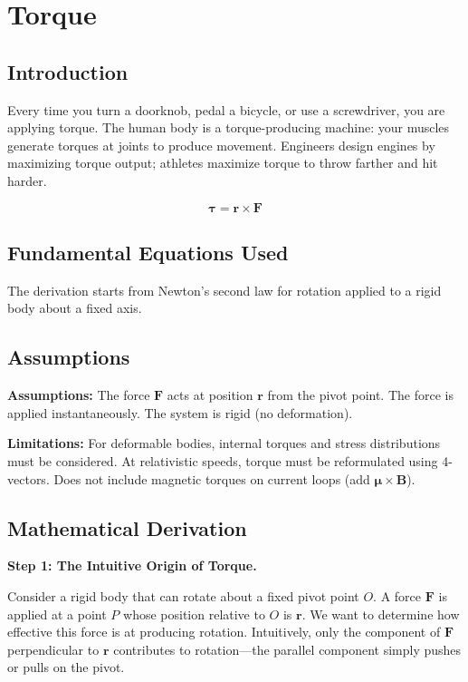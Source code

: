 \chapter{Torque}

\section*{Introduction}

Every time you turn a doorknob, pedal a bicycle, or use a screwdriver, you are applying torque. The human body is a torque-producing machine: your muscles generate torques at joints to produce movement. Engineers design engines by maximizing torque output; athletes maximize torque to throw farther and hit harder.



\[
\boldsymbol{\tau} = \mathbf{r} \times \mathbf{F}
\]

\section*{Fundamental Equations Used}

The derivation starts from Newton's second law for rotation applied to a rigid body about a fixed axis.

\section*{Assumptions}

\textbf{Assumptions:} The force $\mathbf{F}$ acts at position $\mathbf{r}$ from the pivot point. The force is applied instantaneously. The system is rigid (no deformation).


\textbf{Limitations:} For deformable bodies, internal torques and stress distributions must be considered. At relativistic speeds, torque must be reformulated using 4-vectors. Does not include magnetic torques on current loops (add $\boldsymbol{\mu} \times \mathbf{B}$).


\section*{Mathematical Derivation}

\textbf{Step 1: The Intuitive Origin of Torque.}

Consider a rigid body that can rotate about a fixed pivot point $O$. A force $\mathbf{F}$ is applied at a point $P$ whose position relative to $O$ is $\mathbf{r}$. We want to determine how effective this force is at producing rotation. Intuitively, only the component of $\mathbf{F}$ perpendicular to $\mathbf{r}$ contributes to rotation---the parallel component simply pushes or pulls on the pivot.

